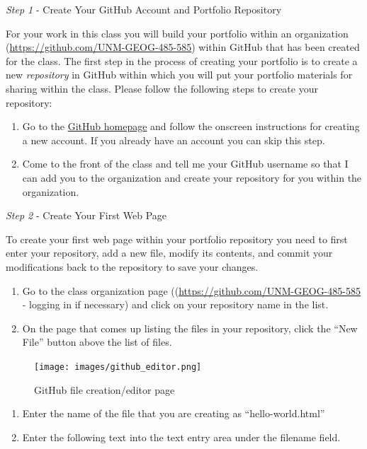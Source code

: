 \documentclass[]{book}
\providecommand{\tightlist}{%
  \setlength{\itemsep}{0pt}\setlength{\parskip}{0pt}}
\begin{document}
\emph{Step 1} - Create Your GitHub Account and Portfolio Repository

For your work in this class you will build your portfolio within an
organization (\url{https://github.com/UNM-GEOG-485-585}) within GitHub
that has been created for the class. The first step in the process of
creating your portfolio is to create a new \emph{repository} in GitHub
within which you will put your portfolio materials for sharing within
the class. Please follow the following steps to create your repository:

\begin{enumerate}
\def\labelenumi{\arabic{enumi}.}
\tightlist
\item
  Go to the \href{https://github.com/}{GitHub homepage} and follow the
  onscreen instructions for creating a new account. If you already have
  an account you can skip this step.
\item
  Come to the front of the class and tell me your GitHub username so
  that I can add you to the organization and create your repository for
  you within the organization.
\end{enumerate}

\emph{Step 2} - Create Your First Web Page

To create your first web page within your portfolio repository you need
to first enter your repository, add a new file, modify its contents, and
commit your modifications back to the repository to save your changes.

\begin{enumerate}
\def\labelenumi{\arabic{enumi}.}
\tightlist
\item
  Go to the class organization page
  ((\url{https://github.com/UNM-GEOG-485-585} - logging in if necessary)
  and click on your repository name in the list.
\item
  On the page that comes up listing the files in your repository, click
  the ``New File'' button above the list of files.
\end{enumerate}

\begin{figure}[htbp]
\centering
\texttt{[image: images/github\_editor.png]}
\caption{GitHub file creation/editor page}
\end{figure}

\begin{enumerate}
\def\labelenumi{\arabic{enumi}.}
\setcounter{enumi}{2}
\tightlist
\item
  Enter the name of the file that you are creating as
  ``hello-world.html''
\item
  Enter the following text into the text entry area under the filename
  field.
\end{enumerate}
\end{document}
